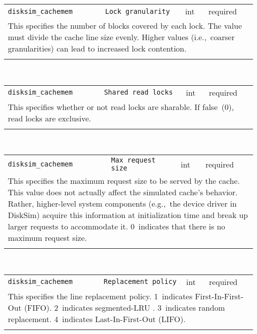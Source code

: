 \noindent 
\begin{tabular}{|p{\lpmodwidth}|p{\lpnamewidth}|p{0.5in}|p{0.5in}|}
\cline{1-4}
\texttt{disksim\_cachemem} & \texttt{Lock granularity} & int & required \\ 
\cline{1-4}
\multicolumn{4}{|p{6in}|}{
This specifies the number of blocks covered by each lock. The value must
divide the cache line size evenly. Higher values (i.e.,~coarser
granularities) can lead to increased lock contention.
}\\ 
\cline{1-4}
\multicolumn{4}{p{5in}}{}\\
\end{tabular}\\ 
\noindent 
\begin{tabular}{|p{\lpmodwidth}|p{\lpnamewidth}|p{0.5in}|p{0.5in}|}
\cline{1-4}
\texttt{disksim\_cachemem} & \texttt{Shared read locks} & int & required \\ 
\cline{1-4}
\multicolumn{4}{|p{6in}|}{
This specifies whether or not read locks are sharable. If false~(0), read
locks are exclusive.
}\\ 
\cline{1-4}
\multicolumn{4}{p{5in}}{}\\
\end{tabular}\\ 
\noindent 
\begin{tabular}{|p{\lpmodwidth}|p{\lpnamewidth}|p{0.5in}|p{0.5in}|}
\cline{1-4}
\texttt{disksim\_cachemem} & \texttt{Max request size} & int & required \\ 
\cline{1-4}
\multicolumn{4}{|p{6in}|}{
This specifies the maximum request size to be served by the cache. This
value does not actually affect the simulated cache's behavior.
Rather, higher-level system components (e.g.,~the device driver in
DiskSim) acquire this information at initialization time and break up
larger requests to accommodate it. 0~indicates that there is no
maximum request size.
}\\ 
\cline{1-4}
\multicolumn{4}{p{5in}}{}\\
\end{tabular}\\ 
\noindent 
\begin{tabular}{|p{\lpmodwidth}|p{\lpnamewidth}|p{0.5in}|p{0.5in}|}
\cline{1-4}
\texttt{disksim\_cachemem} & \texttt{Replacement policy} & int & required \\ 
\cline{1-4}
\multicolumn{4}{|p{6in}|}{
This specifies the line replacement policy.
1~indicates First-In-First-Out (FIFO).
2~indicates segmented-LRU \cite{Karedla94}.
3~indicates random replacement.
4~indicates Last-In-First-Out (LIFO).
}\\ 
\cline{1-4}
\multicolumn{4}{p{5in}}{}\\
\end{tabular}\\ 
